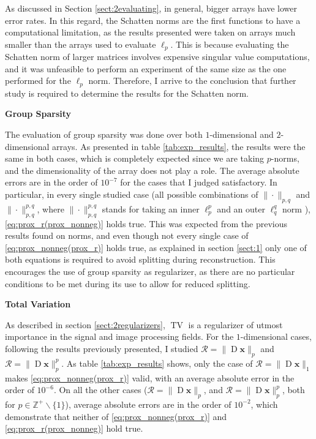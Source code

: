 As discussed in Section \ref{sect:2evaluating}, in general, bigger arrays have lower error rates. In this regard, the Schatten norms are the first functions to have a computational limitation, as the results presented were taken on arrays much smaller than the arrays used to evaluate $\ell_p$. This is because evaluating the Schatten norm of larger matrices involves expensive singular value computations, and it was unfeasible to perform an experiment of the same size as the one performed for the $\ell_p$ norm. Therefore, I arrive to the conclusion that further study is required to determine the results for the Schatten norm.

\noindent\textbf{Group Sparsity}

The evaluation of group sparsity was done over both $1$-dimensional and $2$-dimensional arrays. As presented in table \ref{tab:exp_results}, the results were the same in both cases, which is completely expected since we are taking $p$-norms, and the dimensionality of the array does not play a role. The average absolute errors are in the order of $10^{-7}$ for the cases that I judged satisfactory. In particular, in every single studied case (all possible combinations of $\|\cdot\|_{p, q}$ and $\|\cdot\|_{p, q}^{p, q}$, where $\|\cdot\|_{p, q}^{p, q}$ stands for taking an inner $\ell_p^p$ and an outer $\ell_q^q$ norm ),  \eqref{eq:prox_r(prox_nonneg)} holds true. This was expected from the previous results found on norms, and even though not every single case of  \eqref{eq:prox_nonneg(prox_r)} holds true, as explained in section \ref{sect:1} only one of both equations is required to avoid splitting during reconstruction. This encourages the use of group sparsity as regularizer, as there are no particular conditions to be met during its use to allow for reduced splitting. 

\noindent\textbf{Total Variation} 

As described in section \ref{sect:2regularizers}, $\operatorname{TV}$ is a regularizer of utmost importance in the signal and image processing fields. For the $1$-dimensional cases, following the results previously presented, I studied $\mathcal{R} = \|\operatorname{D}\mathbf{x}\|_p$ and $\mathcal{R} = \|\operatorname{D}\mathbf{x}\|_p^p$. As table \ref{tab:exp_results} shows, only the case of $\mathcal{R} = \|\operatorname{D}\mathbf{x}\|_1$ makes  \eqref{eq:prox_nonneg(prox_r)} valid, with an average absolute error in the order of $10^{-6}$. On all the other cases ($\mathcal{R} = \|\operatorname{D}\mathbf{x}\|_p$, and $\mathcal{R} = \|\operatorname{D}\mathbf{x}\|_p^p$, both for $p \in \mathbb{Z}^+ \backslash\{1\}$), average absolute errors are in the order of $10^{-2}$, which demonstrate that neither of \eqref{eq:prox_nonneg(prox_r)} and \eqref{eq:prox_r(prox_nonneg)} hold true. 

